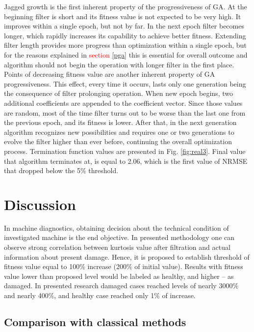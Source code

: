 \documentclass[preprint,12pt]{elsarticle}
\begin{document}
Jagged growth is the first inherent property of the progressiveness of GA. At the beginning filter is short and its fitness value is not expected to be very high. It improves within a single epoch, but not by far. In the next epoch filter becomes longer, which rapidly increases its capability to achieve better fitness. Extending filter length provides more progress than optimization within a single epoch, but for the reasons explained in \textcolor{red}{section} \ref{pga} this is essential for overall outcome and algorithm should not begin the operation with longer filter in the first place. Points of decreasing fitness value are another inherent property of GA progressiveness. This effect, every time it occurs, lasts only one generation being the consequence of filter prolonging operation. When new epoch begins, two additional coefficients are appended to the coefficient vector. Since those values are random, most of the time filter turns out to be worse than the last one from the previous epoch, and its fitness is lower. After that, in the next generation algorithm recognizes new possibilities and requires one or two generations to evolve the filter higher than ever before, continuing the overall optimization process. Termination function values are presented in Fig. \ref{fig:real3}. Final value that algorithm terminates at, is equal to 2.06, which is the first value of NRMSE that dropped below the 5$\%$ threshold.

\section{Discussion}

In machine diagnostics, obtaining decision about the technical condition of investigated machine is the end objective. In presented methodology one can observe strong correlation between kurtosis value after filtration and actual information about present damage. Hence, it is proposed to establish threshold of fitness value equal to 100$\%$ increase (200$\%$ of initial value). Results with fitness value lower than proposed level would be labeled as healthy, and higher – as damaged. In presented research damaged cases reached levels of nearly 3000$\%$ and nearly 400$\%$, and healthy case reached only 1$\%$ of increase.

\subsection{Comparison with classical methods}
\end{document}
